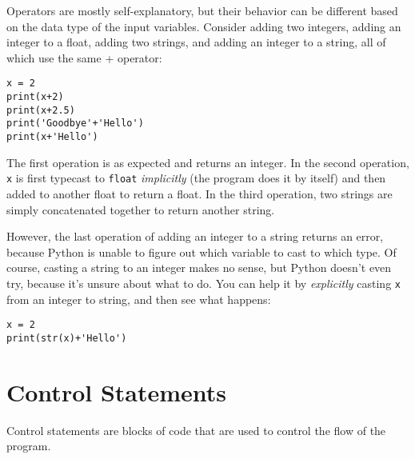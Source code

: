 \documentclass[12pt]{article}
\newcommand{\code}{\texttt}
\begin{document}
Operators are mostly self-explanatory, but their behavior can be different based on the data type of the input variables. Consider adding two integers, adding an integer to a float, adding two strings, and adding an integer to a string, all of which use the same + operator:

\begin{lstlisting}[frame=single] 
x = 2
print(x+2)
print(x+2.5)
print('Goodbye'+'Hello')
print(x+'Hello')
\end{lstlisting}

The first operation is as expected and returns an integer. In the second operation, \code{x} is first typecast to \code{float} \textit{implicitly} (the program does it by itself) and then added to another float to return a float. In the third operation, two strings are simply concatenated together to return another string. 

However, the last operation of adding an integer to a string returns an error, because Python is unable to figure out which variable to cast to which type. Of course, casting a string to an integer makes no sense, but Python doesn't even try, because it's unsure about what to do. You can help it by \textit{explicitly} casting \code{x} from an integer to string, and then see what happens:

\begin{lstlisting}[frame=single] 
x = 2
print(str(x)+'Hello')
\end{lstlisting}

\newpage

\section{Control Statements}
Control statements are blocks of code that are used to control the flow of the program. 
\end{document}
